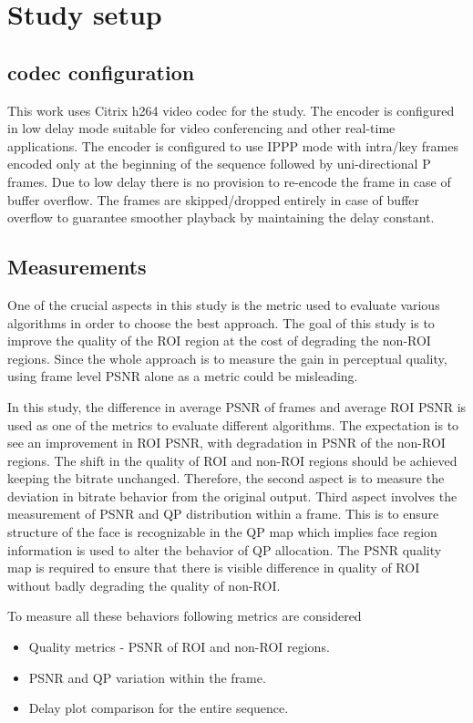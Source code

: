 \documentclass[11pt]{article} %
\begin{document}
\section{Study setup}
\subsection{codec configuration}      
This work uses Citrix h264 video codec for the study. The encoder is configured in low delay mode suitable for video conferencing and other real-time applications. The encoder is configured to use IPPP mode with intra/key frames encoded only at the beginning of the sequence followed by uni-directional P frames. Due to low delay there is no provision to re-encode the frame in case of buffer overflow. The frames are skipped/dropped entirely in case of buffer overflow to guarantee smoother playback by maintaining the delay constant. 
\subsection{Measurements}
One of the crucial aspects in this study is the metric used to evaluate various algorithms in order to choose the best approach. The goal of this study is to improve the quality of the ROI region at the cost of degrading the non-ROI regions. Since the whole approach is to measure the gain in perceptual quality, using frame level PSNR alone as a metric could be misleading. 

In this study, the difference in average PSNR of frames and average ROI PSNR is used as one of the metrics to evaluate different algorithms. The expectation is to see an improvement in ROI PSNR, with degradation in PSNR of the non-ROI regions. The shift in the quality of ROI and non-ROI regions should be achieved keeping the bitrate unchanged. Therefore, the second aspect is to measure the deviation in bitrate behavior from the original output. Third aspect involves the measurement of PSNR and QP distribution within a frame. This is to ensure structure of the face is recognizable in the QP map which implies face region information is used to alter the behavior of QP allocation. The PSNR quality map is required to ensure that there is visible difference in quality of ROI without badly degrading the quality of non-ROI. 

To measure all these behaviors following metrics are considered
\begin{itemize}  
\item Quality metrics - PSNR of ROI and non-ROI regions.
\item PSNR and QP variation within the frame.
\item Delay plot comparison for the entire sequence.
\end{itemize}
\end{document}
